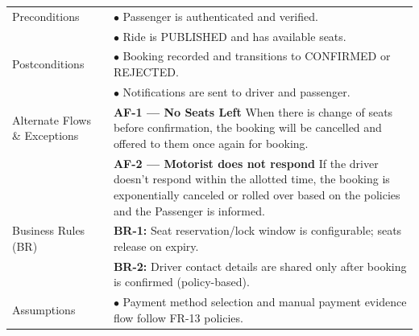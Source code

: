 \begin{longtable}{|>{\raggedright\arraybackslash}p{4cm}|>{\raggedright\arraybackslash}p{11cm}|}
\hline
Preconditions & $\bullet$ Passenger is authenticated and verified. \\
& $\bullet$ Ride is PUBLISHED and has available seats. \\
\hline
Postconditions & $\bullet$ Booking recorded and transitions to CONFIRMED or REJECTED. \\
& $\bullet$ Notifications are sent to driver and passenger. \\
\hline
Alternate Flows \& Exceptions & \textbf{AF-1 — No Seats Left} \newline When there is change of seats before confirmation, the booking will be cancelled and offered to them once again for booking. \\
& \textbf{AF-2 — Motorist does not respond} \newline If the driver doesn't respond within the allotted time, the booking is exponentially canceled or rolled over based on the policies and the Passenger is informed. \\
\hline
Business Rules (BR) & \textbf{BR-1:} Seat reservation/lock window is configurable; seats release on expiry. \\
& \textbf{BR-2:} Driver contact details are shared only after booking is confirmed (policy-based). \\
\hline
Assumptions & $\bullet$ Payment method selection and manual payment evidence flow follow FR-13 policies. \\
\end{longtable}

